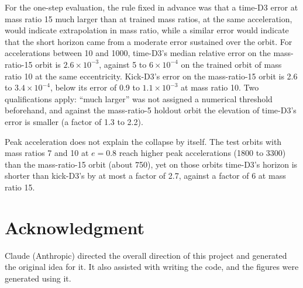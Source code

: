 \documentclass[a4paper,journal]{IEEEtran}
\begin{document}
For the one-step evaluation, the rule fixed in advance was that a time-D3 error at mass ratio 15 much larger than at trained mass ratios, at the same acceleration, would indicate extrapolation in mass ratio, while a similar error would indicate that the short horizon came from a moderate error sustained over the orbit. For accelerations between 10 and 1000, time-D3's median relative error on the mass-ratio-15 orbit is $2.6\times10^{-3}$, against 5 to $6\times10^{-4}$ on the trained orbit of mass ratio 10 at the same eccentricity. Kick-D3's error on the mass-ratio-15 orbit is 2.6 to $3.4\times10^{-4}$, below its error of 0.9 to $1.1\times10^{-3}$ at mass ratio 10. Two qualifications apply: ``much larger'' was not assigned a numerical threshold beforehand, and against the mass-ratio-5 holdout orbit the elevation of time-D3's error is smaller (a factor of 1.3 to 2.2).

Peak acceleration does not explain the collapse by itself. The test orbits with mass ratios 7 and 10 at $e=0.8$ reach higher peak accelerations (1800 to 3300) than the mass-ratio-15 orbit (about 750), yet on those orbits time-D3's horizon is shorter than kick-D3's by at most a factor of 2.7, against a factor of 6 at mass ratio 15.

\section*{Acknowledgment}
Claude (Anthropic) directed the overall direction of this project and generated the original idea for it. It also assisted with writing the code, and the figures were generated using it.

\end{document}
